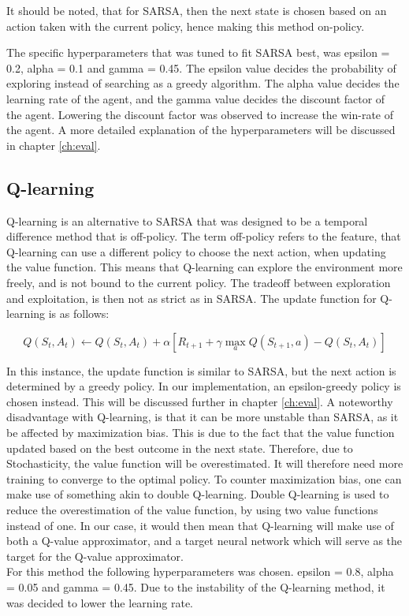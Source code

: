 It should be noted, that for SARSA, then the next state is chosen based on an action taken with the current policy, hence making this method on-policy.

The specific hyperparameters that was tuned to fit SARSA best, was epsilon = 0.2, alpha = 0.1 and gamma = 0.45. The epsilon value decides the probability of exploring instead of searching as a greedy algorithm. The alpha value decides the learning rate of the agent, and the gamma value decides the discount factor of the agent. Lowering the discount factor was observed to increase the win-rate of the agent. A more detailed explanation of the hyperparameters will be discussed in chapter \ref{ch:eval}.

\subsection{Q-learning} \label{sec:Q-learning}
Q-learning is an alternative to SARSA that was designed to be a temporal difference method that is off-policy. The term off-policy refers to the feature, that Q-learning can use a different policy to choose the next action, when updating the value function. This means that Q-learning can explore the environment more freely, and is not bound to the current policy. The tradeoff between exploration and exploitation, is then not as strict as in SARSA. The update function for Q-learning is as follows:

\begin{equation}
    Q(S_t, A_t) \leftarrow Q(S_t, A_t) + \alpha \left[ R_{t+1} + \gamma \max_a Q(S_{t+1}, a) - Q(S_t, A_t) \right]
\end{equation}

In this instance, the update function is similar to SARSA, but the next action is determined by a greedy policy. In our implementation, an epsilon-greedy policy is chosen instead. This will be discussed further in chapter \ref{ch:eval}. A noteworthy disadvantage with Q-learning, is that it can be more unstable than SARSA, as it be affected by maximization bias. This is due to the fact that the value function updated based on the best outcome in the next state. Therefore, due to Stochasticity, the value function will be overestimated. It will therefore need more training to converge to the optimal policy. To counter maximization bias, one can make use of something akin to double Q-learning\cite{Deep_Q_learning}. Double Q-learning is used to reduce the overestimation of the value function, by using two value functions instead of one. In our case, it would then mean that Q-learning will make use of both a Q-value approximator, and a target neural network which will serve as the target for the Q-value approximator.\\
For this method the following hyperparameters was chosen. epsilon = 0.8, alpha = 0.05 and gamma = 0.45. Due to the instability of the Q-learning method, it was decided to lower the learning rate. 



